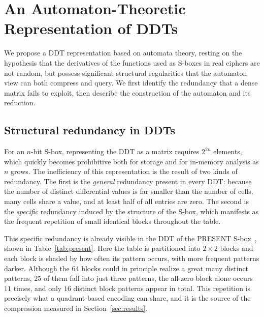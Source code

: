 \documentclass[runningheads]{llncs}
\begin{document}
\section{An Automaton-Theoretic Representation of DDTs}
\label{sec:auto}

We propose a DDT representation based on automata theory, resting on the
hypothesis that the derivatives of the functions used as S-boxes in real ciphers
are not random, but possess significant structural regularities that the
automaton view can both compress and query. We first identify the redundancy
that a dense matrix fails to exploit, then describe the construction of the
automaton and its reduction.

\subsection{Structural redundancy in DDTs}
\label{sec:redundancy}

For an $n$-bit S-box, representing the DDT as a matrix requires $2^{2n}$ elements,
which quickly becomes prohibitive both for storage and for in-memory analysis as
$n$ grows. The inefficiency of this representation is the result of two kinds of
redundancy. The first is the \emph{general} redundancy present in every DDT:
because the number of distinct differential values is far smaller than the number
of cells, many cells share a value, and at least half of all entries are zero. The
second is the \emph{specific} redundancy induced by the structure of the S-box,
which manifests as the frequent repetition of small identical blocks throughout
the table.

This specific redundancy is already visible in the DDT of the PRESENT
S-box~\cite{present}, shown
in Table~\ref{tab:present}. Here the table is partitioned into $2\times 2$ blocks
and each block is shaded by how often its pattern occurs, with more frequent
patterns darker. Although the $64$ blocks could in principle realize a great many
distinct patterns, $25$ of them fall into just three patterns, the all-zero
block alone occurs $11$ times, and only $16$ distinct block patterns appear in
total. This repetition is precisely what a quadrant-based encoding can share, and
it is the source of the compression measured in Section~\ref{sec:results}.

\begin{table}[t]
\centering
\caption{The DDT of the PRESENT S-box, partitioned into $2\times2$ blocks and
shaded by pattern frequency (darker $=$ more frequent; zero entries shown as a
dot). Twenty-five of the $64$ blocks fall into the three most common patterns.}
\label{tab:present}
\setlength{\tabcolsep}{0pt}\renewcommand{\arraystretch}{1.1}
\footnotesize

\end{table}
\end{document}
